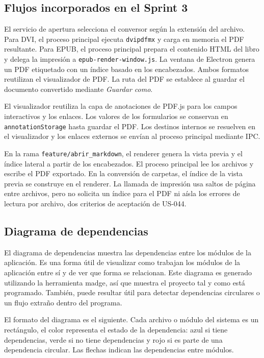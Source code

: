 \subsection{Flujos incorporados en el Sprint 3}

El servicio de apertura selecciona el conversor según la extensión del archivo. Para DVI, el proceso principal ejecuta \texttt{dvipdfmx} y carga en memoria el PDF resultante. Para EPUB, el proceso principal prepara el contenido HTML del libro y delega la impresión a \texttt{epub-render-window.js}. La ventana de Electron genera un PDF etiquetado con un índice basado en los encabezados. Ambos formatos reutilizan el visualizador de PDF. La ruta del PDF se establece al guardar el documento convertido mediante \emph{Guardar como}.

El visualizador reutiliza la capa de anotaciones de PDF.js para los campos interactivos y los enlaces. Los valores de los formularios se conservan en \texttt{annotationStorage} hasta guardar el PDF. Los destinos internos se resuelven en el visualizador y los enlaces externos se envían al proceso principal mediante IPC.

En la rama \texttt{feature/abrir\_markdown}, el renderer genera la vista previa y el índice lateral a partir de los encabezados. El proceso principal lee los archivos y escribe el PDF exportado. En la conversión de carpetas, el índice de la vista previa se construye en el renderer. La llamada de impresión usa saltos de página entre archivos, pero no solicita un índice para el PDF ni aísla los errores de lectura por archivo, dos criterios de aceptación de US-044.

\subsection{Diagrama de dependencias}

El diagrama de dependencias muestra las dependencias entre los módulos de la aplicación. Es una forma útil de visualizar como trabajan los módulos de la aplicación entre sí y de ver que forma se relacionan. Este diagrama es generado utilizando la herramienta madge, así que muestra el proyecto tal y como está programado. También, puede resultar útil para detectar dependencias circulares o un flujo extraño dentro del programa.

El formato del diagrama es el siguiente. Cada archivo o módulo del sistema es un rectángulo, el color representa el estado de la dependencia: azul si tiene dependencias, verde si no tiene dependencias y rojo si es parte de una dependencia circular. Las flechas indican las dependencias entre módulos.


